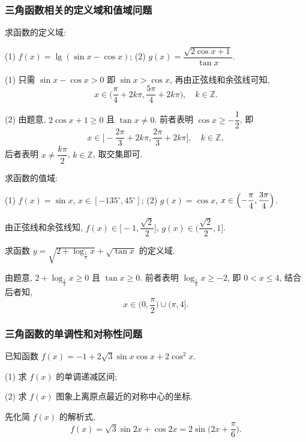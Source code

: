 \subsubsection{三角函数相关的定义域和值域问题}
\begin{example}
    求函数的定义域:
    
    (1) $f(x)=\lg(\sin x-\cos x)$;\quad
    (2) $g(x)=\dfrac{\sqrt{2\cos x+1}}{\tan x}$.
\end{example}
\beginsolution
    (1) 只需 $\sin x-\cos x>0$ 即 $\sin x>\cos x$, 再由正弦线和余弦线可知,
    \[x\in\biggl(\frac\pi4+2k\pi, \frac{5\pi}4+2k\pi\biggr),\quad
        k\in\mathbb{Z}.\]

    (2) 由题意, $2\cos x+1\geqslant 0$ 且 $\tan x\neq 0$. 前者表明 $\cos x\geqslant -\dfrac12$, 即
    \[x\in \biggl[-\frac{2\pi}{3}+ 2k\pi, \frac{2\pi}{3}+ 2k\pi\biggr],\quad k\in\mathbb{Z},\]
    后者表明 $x\neq \dfrac{k\pi}2$, $k\in\mathbb{Z}$, 取交集即可.
\endsolution

\begin{example}
    求函数的值域:
    
    (1) $f(x)=\sin x$, $x\in[-135^\circ,45^\circ]$;\quad
    (2) $g(x)=\cos x$, $x\in\Bigl(-\dfrac{\pi}4,\dfrac{3\pi}4\Bigr)$.
\end{example}
\beginsolution
    由正弦线和余弦线知, $f(x)\in\biggl[-1, \dfrac{\sqrt2}2\biggr]$, $g(x)\in\biggl(\dfrac{\sqrt2}2, 1\biggr]$.
\endsolution

\lianxi
\begin{exercise}[s]
    求函数 $y= \sqrt{2+\log_{\frac12} x}+ \sqrt{\tan x}$ 的定义域.
\end{exercise}
\beginsolution
    由题意, $2+\log_{\frac12} x\geqslant 0$ 且 $\tan x\geqslant 0$. 前者表明 $\log_{\frac12} x\geqslant -2$, 即 $0<x\leqslant 4$, 
    结合后者知,
    \[x\in\biggl(0,\frac\pi2\biggr)\cup (\pi,4].\]
\endsolution

\subsubsection{三角函数的单调性和对称性问题}
\begin{example}
    已知函数 $f(x)=-1+2\sqrt3 \sin x\cos x+2\cos^2 x$.
    
    (1) 求 $f(x)$ 的单调递减区间;
    
    (2) 求 $f(x)$ 图象上离原点最近的对称中心的坐标.
\end{example}
\beginsolution
    先化简 $f(x)$ 的解析式,
    \[f(x)= \sqrt3\sin2x+ \cos2x
        = 2\sin\biggl(2x+\frac\pi6\biggr).\]
    
